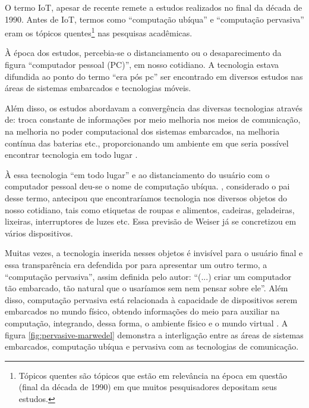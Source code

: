 O termo IoT, apesar de recente remete a estudos realizados no final da década
de 1990. Antes de IoT, termos como ``computação ubíqua'' e ``computação pervasiva''
eram os tópicos quentes\footnote{Tópicos quentes são tópicos que estão em relevância
na época em questão (final da década de 1990) em que muitos pesquisadores depositam seus 
estudos.} nas pesquisas acadêmicas.

À época dos estudos, percebia-se o distanciamento ou o desaparecimento da
figura ``computador pessoal (PC)'', em nosso cotidiano. A tecnologia estava
difundida ao ponto do termo  ``era pós pc'' ser encontrado em diversos estudos
\cite{bonilla2011inclusao,  chen2011pospc, press1999personal} nas áreas de
sistemas embarcados e tecnologias móveis.

Além disso, os estudos abordavam a convergência das diversas tecnologias 
através de: troca constante de informações por meio melhoria nos meios de comunicação,
na melhoria no poder computacional dos sistemas embarcados, na melhoria contínua 
das baterias etc., proporcionando um ambiente em que seria possível encontrar
tecnologia em todo lugar \cite{lyytinen2002ubiquitous}.

À essa tecnologia ``em todo lugar'' e ao distanciamento do usuário com o
computador pessoal deu-se o nome de computação ubíqua.
, considerado o pai desse termo, antecipou que
encontraríamos tecnologia nos diversos objetos do nosso cotidiano, tais como
etiquetas de roupas e alimentos, cadeiras, geladeiras, lixeiras, interruptores
de luzes etc. Essa previsão de Weiser já se concretizou em vários dispositivos.


Muitas vezes, a tecnologia inserida nesses objetos é invisível para o usuário
final e essa transparência era defendida por  para
apresentar um outro termo, a ``computação pervasiva'', assim definida pelo
autor: ``(...) criar  um computador tão embarcado, tão natural que o usaríamos
sem nem pensar sobre ele''. Além disso, computação pervasiva está relacionada à
capacidade de dispositivos serem embarcados no mundo físico, obtendo
informações do meio para auxiliar na computação, integrando, dessa forma, o
ambiente físico e o mundo virtual \cite{bolsoni2009computaccao,
de2003computaccao}. A figura  \ref{fig:pervasive-marwedel} demonstra a
interligação entre as áreas de sistemas embarcados, computação ubíqua e
pervasiva com as tecnologias de comunicação.


